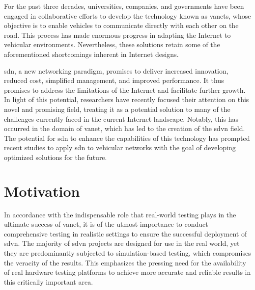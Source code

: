 For the past three decades, universities, companies, and governments have been engaged in collaborative efforts to develop the technology known as \glspl{vanet}, whose objective is to enable vehicles to communicate directly with each other on the road.
This process has made enormous progress in adapting the Internet to vehicular environments. Nevertheless, these solutions retain some of the aforementioned shortcomings inherent in Internet designs.

\gls{sdn}, a new networking paradigm, promises to deliver increased innovation, reduced cost, simplified management, and improved performance.
It thus promises to address the limitations of the Internet and facilitate further growth. In light of this potential, researchers have recently focused their attention on this novel and promising field, treating it as a potential solution to many of the challenges currently faced in the current Internet landscape.
Notably, this has occurred in the domain of \gls{vanet}, which has led to the creation of the \gls{sdvn} field. The potential for \gls{sdn} to enhance the capabilities of this technology has prompted recent studies to apply \gls{sdn} to vehicular networks with the goal of developing optimized solutions for the future.


\section{Motivation} %
\label{sec:motivation}


In accordance with the indispensable role that real-world testing plays in the ultimate success of \gls{vanet}, it is of the utmost importance to conduct comprehensive testing in realistic settings to ensure the successful deployment of \gls{sdvn}. The majority of \gls{sdvn} projects are designed for use in the real world, yet they are predominantly subjected to simulation-based testing, which compromises the veracity of the results. This emphasizes the pressing need for the availability of real hardware testing platforms to achieve more accurate and reliable results in this critically important area. 

